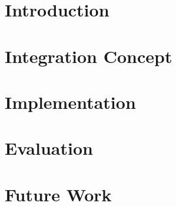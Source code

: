 \chapter{Introduction}


\chapter{Integration Concept}


\chapter{Implementation}


\chapter{Evaluation}


\chapter{Future Work}


